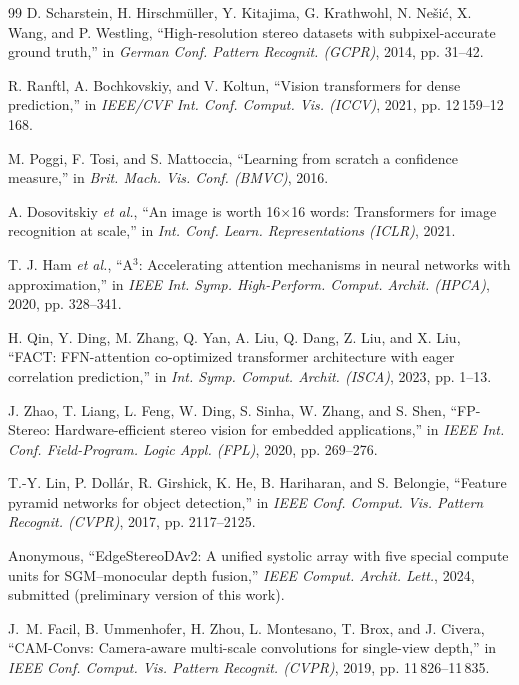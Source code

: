 \documentclass[journal]{IEEEtran}
\begin{document}
\begin{thebibliography}{99}
D. Scharstein, H. Hirschm\"uller, Y. Kitajima, G. Krathwohl, N. Ne\v{s}i\'c, X. Wang, and P. Westling, ``High-resolution stereo datasets with subpixel-accurate ground truth,'' in \textit{German Conf. Pattern Recognit. (GCPR)}, 2014, pp. 31--42.

R. Ranftl, A. Bochkovskiy, and V. Koltun, ``Vision transformers for dense prediction,'' in \textit{IEEE/CVF Int. Conf. Comput. Vis. (ICCV)}, 2021, pp. 12\,159--12\,168.

M. Poggi, F. Tosi, and S. Mattoccia, ``Learning from scratch a confidence measure,'' in \textit{Brit. Mach. Vis. Conf. (BMVC)}, 2016.

A. Dosovitskiy \textit{et al.}, ``An image is worth 16$\times$16 words: Transformers for image recognition at scale,'' in \textit{Int. Conf. Learn. Representations (ICLR)}, 2021.

T. J. Ham \textit{et al.}, ``A$^3$: Accelerating attention mechanisms in neural networks with approximation,'' in \textit{IEEE Int. Symp. High-Perform. Comput. Archit. (HPCA)}, 2020, pp. 328--341.

H. Qin, Y. Ding, M. Zhang, Q. Yan, A. Liu, Q. Dang, Z. Liu, and X. Liu, ``FACT: FFN-attention co-optimized transformer architecture with eager correlation prediction,'' in \textit{Int. Symp. Comput. Archit. (ISCA)}, 2023, pp. 1--13.

J. Zhao, T. Liang, L. Feng, W. Ding, S. Sinha, W. Zhang, and S. Shen, ``FP-Stereo: Hardware-efficient stereo vision for embedded applications,'' in \textit{IEEE Int. Conf. Field-Program. Logic Appl. (FPL)}, 2020, pp. 269--276.

T.-Y. Lin, P. Doll\'ar, R. Girshick, K. He, B. Hariharan, and S. Belongie, ``Feature pyramid networks for object detection,'' in \textit{IEEE Conf. Comput. Vis. Pattern Recognit. (CVPR)}, 2017, pp. 2117--2125.

Anonymous, ``EdgeStereoDAv2: A unified systolic array with five special compute units for SGM--monocular depth fusion,'' \textit{IEEE Comput. Archit. Lett.}, 2024, submitted (preliminary version of this work).

J.~M. Facil, B. Ummenhofer, H. Zhou, L. Montesano, T. Brox, and J. Civera, ``CAM-Convs: Camera-aware multi-scale convolutions for single-view depth,'' in \textit{IEEE Conf. Comput. Vis. Pattern Recognit. (CVPR)}, 2019, pp. 11\,826--11\,835.


\end{thebibliography}
\end{document}
